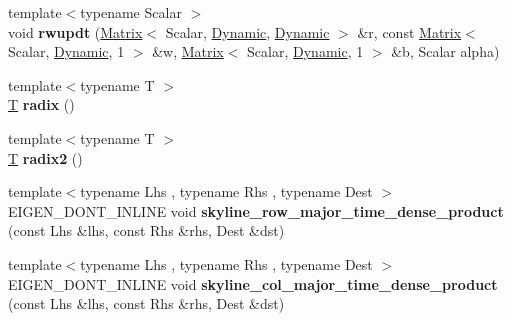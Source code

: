 \begin{DoxyCompactItemize}
\item 
\mbox{\label{namespace_eigen_1_1internal_a7388dcf5dee594ea6b29d53c8681a63f}} 
{\footnotesize template$<$typename Scalar $>$ }\\void {\bfseries rwupdt} (\hyperlink{group___core___module_class_eigen_1_1_matrix}{Matrix}$<$ Scalar, \hyperlink{namespace_eigen_ad81fa7195215a0ce30017dfac309f0b2}{Dynamic}, \hyperlink{namespace_eigen_ad81fa7195215a0ce30017dfac309f0b2}{Dynamic} $>$ \&r, const \hyperlink{group___core___module_class_eigen_1_1_matrix}{Matrix}$<$ Scalar, \hyperlink{namespace_eigen_ad81fa7195215a0ce30017dfac309f0b2}{Dynamic}, 1 $>$ \&w, \hyperlink{group___core___module_class_eigen_1_1_matrix}{Matrix}$<$ Scalar, \hyperlink{namespace_eigen_ad81fa7195215a0ce30017dfac309f0b2}{Dynamic}, 1 $>$ \&b, Scalar alpha)
\item 
\mbox{\label{namespace_eigen_1_1internal_a55dafaacb3ca3978243f34a1e1a88d74}} 
{\footnotesize template$<$typename T $>$ }\\\hyperlink{group___sparse_core___module}{T} {\bfseries radix} ()
\item 
\mbox{\label{namespace_eigen_1_1internal_a3049019ef9e11eeb1f5790e1d2a09287}} 
{\footnotesize template$<$typename T $>$ }\\\hyperlink{group___sparse_core___module}{T} {\bfseries radix2} ()
\item 
\mbox{\label{namespace_eigen_1_1internal_a1c2171ffcb651a274361ab6faa5f6a82}} 
{\footnotesize template$<$typename Lhs , typename Rhs , typename Dest $>$ }\\E\+I\+G\+E\+N\+\_\+\+D\+O\+N\+T\+\_\+\+I\+N\+L\+I\+NE void {\bfseries skyline\+\_\+row\+\_\+major\+\_\+time\+\_\+dense\+\_\+product} (const Lhs \&lhs, const Rhs \&rhs, Dest \&dst)
\item 
\mbox{\label{namespace_eigen_1_1internal_ae6ec7bdef7e6e92d575cfef004018536}} 
{\footnotesize template$<$typename Lhs , typename Rhs , typename Dest $>$ }\\E\+I\+G\+E\+N\+\_\+\+D\+O\+N\+T\+\_\+\+I\+N\+L\+I\+NE void {\bfseries skyline\+\_\+col\+\_\+major\+\_\+time\+\_\+dense\+\_\+product} (const Lhs \&lhs, const Rhs \&rhs, Dest \&dst)
\item 

\end{DoxyCompactItemize}
